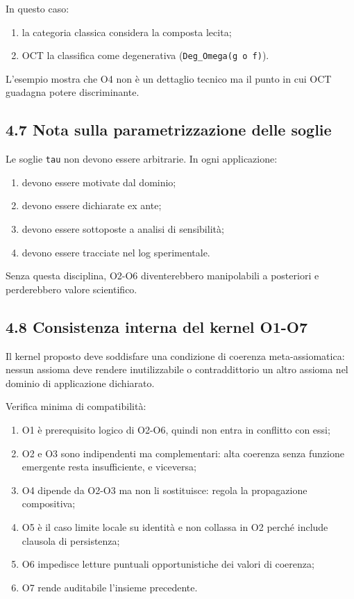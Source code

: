 In questo caso:

\begin{enumerate}
\def\labelenumi{\arabic{enumi}.}
\tightlist
\item
  la categoria classica considera la composta lecita;
\item
  OCT la classifica come degenerativa (\texttt{Deg\_Omega(g\ o\ f)}).
\end{enumerate}

L'esempio mostra che O4 non è un dettaglio tecnico ma il punto in cui OCT guadagna potere discriminante.

\subsection{4.7 Nota sulla parametrizzazione delle soglie}

Le soglie \texttt{tau} non devono essere arbitrarie. In ogni applicazione:

\begin{enumerate}
\def\labelenumi{\arabic{enumi}.}
\tightlist
\item
  devono essere motivate dal dominio;
\item
  devono essere dichiarate ex ante;
\item
  devono essere sottoposte a analisi di sensibilità;
\item
  devono essere tracciate nel log sperimentale.
\end{enumerate}

Senza questa disciplina, O2-O6 diventerebbero manipolabili a posteriori e perderebbero valore scientifico.

\subsection{4.8 Consistenza interna del kernel O1-O7}

Il kernel proposto deve soddisfare una condizione di coerenza meta-assiomatica: nessun assioma deve rendere inutilizzabile o contraddittorio un altro assioma nel dominio di applicazione dichiarato.

Verifica minima di compatibilità:

\begin{enumerate}
\def\labelenumi{\arabic{enumi}.}
\tightlist
\item
  O1 è prerequisito logico di O2-O6, quindi non entra in conflitto con essi;
\item
  O2 e O3 sono indipendenti ma complementari: alta coerenza senza funzione emergente resta insufficiente, e viceversa;
\item
  O4 dipende da O2-O3 ma non li sostituisce: regola la propagazione compositiva;
\item
  O5 è il caso limite locale su identità e non collassa in O2 perché include clausola di persistenza;
\item
  O6 impedisce letture puntuali opportunistiche dei valori di coerenza;
\item
  O7 rende auditabile l'insieme precedente.
\end{enumerate}

